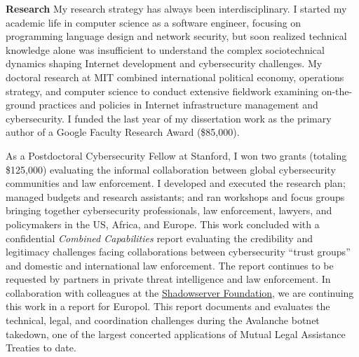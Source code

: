 \documentclass[11pt]{letter}
\begin{document}
\begin{letter}
\textbf{Research} \vspace{0.2 \baselineskip} \newline %
%
My research strategy has always been interdisciplinary. 
%
I started my academic life in computer science as a software engineer, focusing on programming language design and network security, but soon realized technical knowledge alone was insufficient to understand the complex sociotechnical dynamics shaping Internet development and cybersecurity challenges.
My doctoral research at MIT combined international political economy, operations strategy, and computer science to conduct extensive fieldwork examining on-the-ground practices and policies in Internet infrastructure management and cybersecurity.
%
I funded the last year of my dissertation work as the primary author of a Google Faculty Research Award (\$85,000). 
%

As a Postdoctoral Cybersecurity Fellow at Stanford, I won two grants (totaling \$125,000) evaluating the informal collaboration between global  cybersecurity communities and law enforcement.
%
%
I developed and executed the research plan; managed budgets and research assistants; and ran workshops and focus groups bringing together cybersecurity professionals, law enforcement, lawyers, and policymakers in the US, Africa, and Europe.
%
This work concluded with a confidential \emph{Combined Capabilities} report evaluating the credibility and legitimacy challenges facing collaborations between cybersecurity ``trust groups'' and domestic and international law enforcement.
%
The report continues to be requested by partners in private threat intelligence and law enforcement.
%
%
In collaboration with colleagues at the \href{https://www.shadowserver.org/}{Shadowserver Foundation}, we are continuing this work in a report for Europol.
%
This report documents and evaluates the technical, legal, and coordination challenges during the Avalanche botnet takedown, one of the largest concerted applications of Mutual Legal Assistance Treaties to date.



\end{letter}
\end{document}
